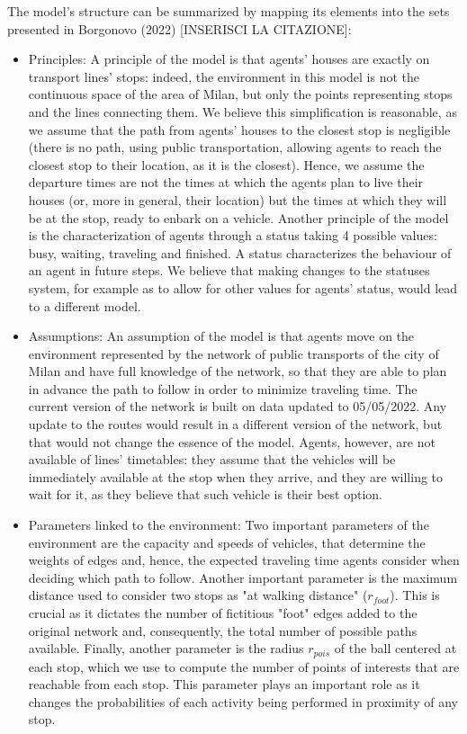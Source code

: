 The model's structure can be summarized by mapping its elements into the sets presented in Borgonovo (2022) [INSERISCI LA CITAZIONE]:
\begin{itemize}
\item Principles: A principle of the model is that agents' houses are exactly on transport lines' stops: indeed, the environment in this model is not the continuous space of the area of Milan, but only the points representing stops and the lines connecting them. We believe this simplification is reasonable, as we assume that the path from agents' houses to the closest stop is negligible (there is no path, using public transportation, allowing agents to reach the closest stop to their location, as it is the closest). Hence, we assume the departure times are not the times at which the agents plan to live their houses (or, more in general, their location) but the times at which they will be at the stop, ready to enbark on a vehicle. Another principle of the model is the characterization of agents through a status taking 4 possible values: busy, waiting, traveling and finished. A status characterizes the behaviour of an agent in future steps. We believe that making changes to the statuses system, for example as to allow for other values for agents' status, would lead to a different model. 
\item Assumptions: An assumption of the model is that agents move on the environment represented by the network of public transports of the city of Milan and have full knowledge of the network, so that they are able to plan in advance the path to follow in order to minimize traveling time. The current version of the network is built on data updated to 05/05/2022. Any update to the routes would result in a different version of the network, but that would not change the essence of the model. Agents, however, are not available of lines' timetables: they assume that the vehicles will be immediately available at the stop when they arrive, and they are willing to wait for it, as they believe that such vehicle is their best option.
\item Parameters linked to the environment: Two important parameters of the environment are the capacity and speeds of vehicles, that determine the weights of edges and, hence, the expected traveling time agents consider when deciding which path to follow. Another important parameter is the maximum distance used to consider two stops as "at walking distance" ($r_{foot}$). This is crucial as it dictates the number of fictitious "foot" edges added to the original network and, consequently, the total number of possible paths available. Finally, another parameter is the radius $r_{pois}$ of the ball centered at each stop, which we use to compute the number of points of interests that are reachable from each stop. This parameter plays an important role as it changes the probabilities of each activity being performed in proximity of any stop.

\end{itemize}
